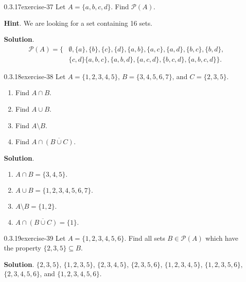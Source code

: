 \documentclass[twoside,11pt,]{book}
\numberwithin{equation}{chapter}
\newcommand{\pow}{\mathcal P}
\newcommand{\amp}{&}
\begin{document}
\begin{divisionsolution}{0.3.17}{}{exercise-37}%
\hypertarget{p-704}{}%
Let \(A = \{a, b, c, d\}\). Find \(\pow(A)\).%
\par\smallskip%
\noindent\textbf{Hint}.\quad%
\hypertarget{p-705}{}%
We are looking for a set containing 16 sets.%
\par\smallskip%
\noindent\textbf{Solution}.\quad%
\hypertarget{p-706}{}%
%
\begin{align*}
\pow(A) = \{\amp \emptyset, \{a\}, \{b\}, \{c\}, \{d\}, \{a,b\}, \{a,c\}, \{a,d\}, \{b,c\}, \{b,d\},\\
\amp \{c,d\} \{a,b,c\}, \{a,b,d\}, \{a,c,d\}, \{b,c,d\}, \{a,b,c,d\}\}\text{.}
\end{align*}
%
\end{divisionsolution}%
\begin{divisionsolution}{0.3.18}{}{exercise-38}%
\hypertarget{p-717}{}%
Let \(A = \{1,2,3,4,5\}\text{,}\) \(B = \{3,4,5,6,7\}\text{,}\) and \(C = \{2,3,5\}\text{.}\)\leavevmode%
\begin{enumerate}[label=(\alph*)]
\item\hypertarget{li-656}{}\hypertarget{p-718}{}%
Find \(A \cap B\text{.}\)%
\item\hypertarget{li-657}{}\hypertarget{p-720}{}%
Find \(A \cup B\text{.}\)%
\item\hypertarget{li-658}{}\hypertarget{p-722}{}%
Find \(A \setminus B\text{.}\)%
\item\hypertarget{li-659}{}\hypertarget{p-724}{}%
Find \(A \cap \overline{(B \cup C)}\text{.}\)%
\end{enumerate}
%
\par\smallskip%
\noindent\textbf{Solution}.\quad%
\hypertarget{p-726}{}%
\leavevmode%
\begin{enumerate}[label=(\alph*)]
\item\hypertarget{li-660}{}\hypertarget{p-727}{}%
\(A \cap B = \{3,4,5\}\text{.}\)%
\item\hypertarget{li-661}{}\hypertarget{p-728}{}%
\(A \cup B = \{1,2,3,4,5,6,7\}\text{.}\)%
\item\hypertarget{li-662}{}\hypertarget{p-729}{}%
\(A \setminus B = \{1,2\}\text{.}\)%
\item\hypertarget{li-663}{}\hypertarget{p-730}{}%
\(A \cap \overline{(B \cup C)} = \{1\}\text{.}\)%
\end{enumerate}
%
\end{divisionsolution}%
\begin{divisionsolution}{0.3.19}{}{exercise-39}%
\hypertarget{p-731}{}%
Let \(A = \{1,2,3,4,5,6\}\). Find all sets \(B \in \pow(A)\) which have the property \(\{2,3,5\} \subseteq B\).%
\par\smallskip%
\noindent\textbf{Solution}.\quad%
\hypertarget{p-732}{}%
\(\{2,3,5\}\), \(\{1,2,3,5\}\), \(\{2,3,4,5\}\), \(\{2,3,5,6\}\), \(\{1,2,3,4,5\}\), \(\{1,2,3,5,6\}\), \(\{2,3,4,5,6\}\), and \(\{1,2,3,4,5,6\}\).%
\end{divisionsolution}%
\end{document}
